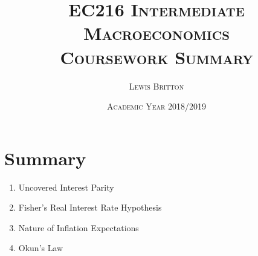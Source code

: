 \documentclass[11pt, english]{article}
\begin{document}

        \title{\textsc{EC216 Intermediate Macroeconomics\\ Coursework Summary}}
        \author{\textsc{Lewis Britton}}
        \date{\textsc{Academic Year 2018/2019}}
        \maketitle

\newpage


        \renewcommand{\contentsname}{Table of Contents}

        \tableofcontents

\newpage


\section{Summary}

	\begin{enumerate}
	\setlength\itemsep{0cm}
		\item Uncovered Interest Parity
		\item Fisher’s Real Interest Rate Hypothesis
		\item Nature of Inflation Expectations
		\item Okun’s Law
	\end{enumerate}
\end{document}
